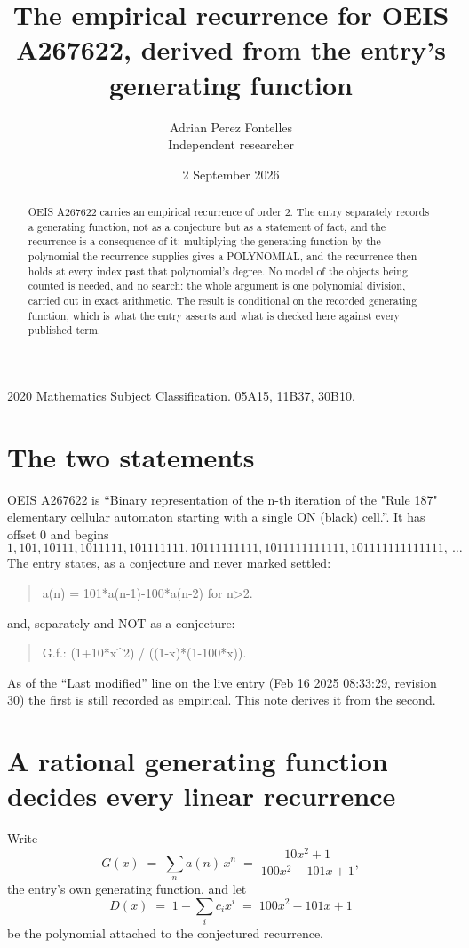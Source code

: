 \documentclass[11pt,a4paper]{article}
\title{The empirical recurrence for OEIS A267622, derived from the entry's generating function}
\author{Adrian Perez Fontelles\\ \small Independent researcher}
\date{2 September 2026}
\theoremstyle{plain}
\theoremstyle{definition}
\begin{document}
\maketitle

\begin{abstract}
OEIS A267622 carries an empirical recurrence of order $2$. The entry separately records a
generating function, not as a conjecture but as a statement of fact, and the recurrence is a
consequence of it: multiplying the generating function by the polynomial the recurrence
supplies gives a POLYNOMIAL, and the recurrence then holds at every index past that
polynomial's degree. No model of the objects being counted is needed, and no search: the
whole argument is one polynomial division, carried out in exact arithmetic. The result is
conditional on the recorded generating function, which is what the entry asserts and what is
checked here against every published term.
\end{abstract}

\noindent\small 2020 Mathematics Subject Classification. 05A15, 11B37, 30B10.\normalsize

\section{The two statements}

OEIS A267622 is ``Binary representation of the n-th iteration of the "Rule 187" elementary cellular automaton starting with a single ON (black) cell.''. It has offset $0$ and begins
\[
1, 101, 10111, 1011111, 101111111, 10111111111, 1011111111111, 101111111111111,\ \dots
\]
The entry states, as a conjecture and never marked settled:
\begin{quote}
a(n) = 101*a(n-1)-100*a(n-2) for n>2.
\end{quote}
and, separately and NOT as a conjecture:
\begin{quote}
G.f.: (1+10*x\^{}2) / ((1-x)*(1-100*x)).
\end{quote}
As of the ``Last modified'' line on the live entry (Feb 16 2025 08:33:29, revision 30) the first is still
recorded as empirical. This note derives it from the second.

\section{A rational generating function decides every linear recurrence}

Write
\[
G(x)\;=\;\sum_{n}a(n)\,x^{n}\;=\;\frac{10 x^{2} + 1}{100 x^{2} - 101 x + 1},
\]
the entry's own generating function, and let
\[
D(x)\;=\;1-\sum_i c_i x^{i}\;=\;100 x^{2} - 101 x + 1
\]
be the polynomial attached to the conjectured recurrence.
\end{document}
